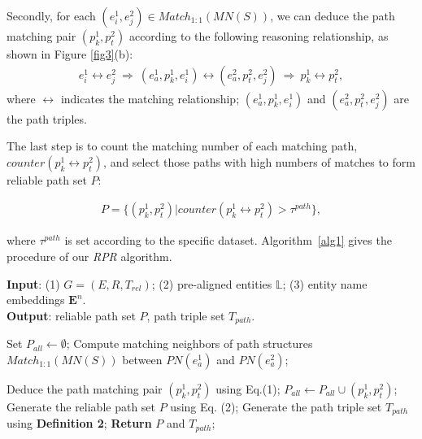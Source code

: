 \documentclass{article}
\begin{document}
Secondly, for each $(e^1_i, e^2_j) \in Match_{1:1}(MN(S))$, we can deduce the path matching pair $(p^1_k, p^2_t)$ according to the following reasoning relationship, as shown in Figure \ref{fig3}(b):
\begin{align}
e_i^{1} \leftrightarrow e_j^{2} \ \Rightarrow \ 
(e^1_a, p^1_k, e^1_i) \leftrightarrow (e^2_a, p^2_t, e_j^2) \ \Rightarrow \ 
p^1_k \leftrightarrow p^2_t,
\end{align}where
$ \leftrightarrow $ indicates the matching relationship;
$(e^1_a, p_k^{1}, e^1_i)$ and $ (e^2_a, p^2_t, e_j^2)$ are the path triples.


The last step is to count the matching number of each matching path, $counter(p^1_k \leftrightarrow p^2_t)$, and select those paths with high numbers of matches to form reliable path set $P$:
\begin{small}
	\begin{align}
	P = \{ (p^1_k, p^2_t) |counter(p^1_k \leftrightarrow p^2_t) > \tau^{path} \},
	\end{align} 
\end{small}where
$\tau^{path}$ is set according to the specific dataset.
Algorithm~\ref{alg1} gives the procedure of our \textit{RPR} algorithm.

\begin{algorithm}[h]
	\caption{Procedure of \textit{RPR} Algorithm.}
	\label{alg1}
	\textbf{Input}: (1) $G =\!(E,R,T_{rel})$;
	(2) pre-aligned entities $\mathbb{L}$;
	(3) entity name embeddings $\mathbf{E}^{n}$.\\
	\textbf{Output}: reliable path set $P$, path triple set $T_{path}$.
	
	\begin{algorithmic}[1]
		\STATE Set $P_{all} \leftarrow \emptyset $;
		\STATE Compute matching neighbors of path structures $Match_{1:1}\!(MN(S))$ between $PN(e^1_a)$ and $PN(e^2_a)$;
		
		\FOR {$ (e^1_i, e^2_j) \in Match_{1:1}(MN(S))$}
		\STATE Deduce the path matching pair $(p^1_k, p^2_t)$ using Eq.(1);
		\STATE $P_{all} \leftarrow P_{all} \cup {(p^1_k, p^2_t)}$;
		\ENDFOR
		\ENDFOR
		\STATE Generate the reliable path set $P$ using Eq. (2);
		\STATE Generate the path triple set $T_{path}$ using \textbf{Definition 2};
		\STATE \textbf{Return} $P$ and $T_{path}$;
	\end{algorithmic}
\end{algorithm}

\end{document}
